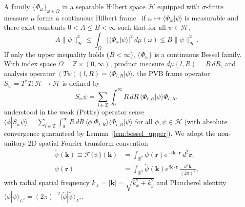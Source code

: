 \documentclass[aps,pra,onecolumn,notitlepage,11pt,tightenlines,nofootinbib,floatfix,longbibliography]{revtex4-2}
\theoremstyle{remark}
\newcommand{\braket}[2]{\langle #1 | #2 \rangle}
\newcommand{\norm}[1]{\lVert #1 \rVert}
\newcommand{\abs}[1]{\lvert #1 \rvert}
\begin{document}
A family $\{\Phi_\omega\}_{\omega\in\Omega}$ in a separable Hilbert space $\mathcal{H}$ equipped with $\sigma$-finite measure $\mu$ forms a continuous Hilbert frame~\cite{Duffin1952,Daubechies1990,Ali1993,Christensen2016} if $\omega \mapsto \braket{\Phi_\omega}{\psi}$ is measurable and there exist constants $0 < A \le B < \infty$ such that for all $\psi \in \mathcal{H}$,
\begin{equation}
A \norm{\psi}_{\mathcal{H}}^2 \le \int_\Omega \abs{\braket{\Phi_\omega}{\psi}}^2\,d\mu(\omega) \le B \norm{\psi}_{\mathcal{H}}^2.
\label{eq:frame_def}
\end{equation}
If only the upper inequality holds ($B < \infty$), $\{\Phi_\omega\}$ is a continuous Bessel family. With index space $\Omega = \mathbb{Z} \times (0,\infty)$, product measure $d\mu(l,R) = R\,dR$, and analysis operator $(T\psi)(l,R) = \braket{\Phi_{l,R}}{\psi}$, the PVB frame operator $S_w = T^* T : \mathcal{H} \to \mathcal{H}$ is defined by
\begin{equation}
S_w\psi = \sum_{l\in\mathbb{Z}} \int_0^\infty R\,dR\, \braket{\Phi_{l,R}}{\psi}\Phi_{l,R},
\label{eq:frame_op}
\end{equation}
understood in the weak (Pettis) operator sense $\braket{\phi}{S_w\psi} = \sum_{l\in\mathbb{Z}}\int_0^\infty R\,dR\,\braket{\phi}{\Phi_{l,R}}\braket{\Phi_{l,R}}{\psi}$ for all $\phi,\psi \in \mathcal{H}$ (with absolute convergence guaranteed by Lemma~\ref{lem:bessel_upper}). We adopt the non-unitary 2D spatial Fourier transform convention
\begin{align}
\widetilde{\psi}(\mathbf{k}) \equiv \mathcal{F}\{\psi\}(\mathbf{k}) &= \int_{\mathbb{R}^2} \psi(\mathbf{r}) e^{-i\mathbf{k}\cdot\mathbf{r}}\,d^2\mathbf{r}, \nonumber \\
\psi(\mathbf{r}) &= \int_{\mathbb{R}^2} \widetilde{\psi}(\mathbf{k}) e^{i\mathbf{k}\cdot\mathbf{r}}\,\frac{d^2\mathbf{k}}{(2\pi)^2},
\label{eq:ft_convention}
\end{align}
with radial spatial frequency $k_\perp = \abs{\mathbf{k}} = \sqrt{k_x^2 + k_y^2}$ and Plancherel identity $\braket{\phi}{\psi}_{L^2} = (2\pi)^{-2}\braket{\widetilde{\phi}}{\widetilde{\psi}}_{L^2}$.
\end{document}
